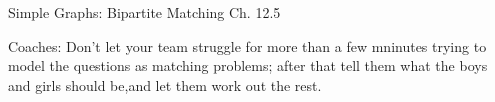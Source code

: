 \documentclass[handout]{mcs}
\begin{document}

\begin{staffnotes}
Simple Graphs: Bipartite Matching Ch. 12.5

Coaches: Don't let your team struggle for more than a few mninutes
trying to model the questions as matching problems; after that tell
them what the boys and girls should be,and let them work out the rest.
\end{staffnotes}








\end{document}
